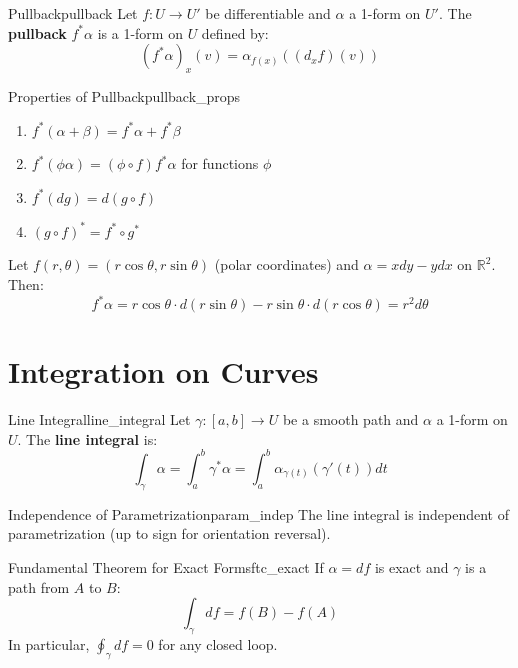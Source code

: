 \documentclass[11pt, letterpaper, openany]{book}
\begin{document}
\begin{defn}{Pullback}{pullback}
Let $f: U \to U'$ be differentiable and $\alpha$ a 1-form on $U'$. The \textbf{pullback} $f^*\alpha$ is a 1-form on $U$ defined by:
\[
(f^*\alpha)_x(v) = \alpha_{f(x)}((d_x f)(v))
\]
\end{defn}

\begin{thm}{Properties of Pullback}{pullback_props}
\begin{enumerate}
    \item $f^*(\alpha + \beta) = f^*\alpha + f^*\beta$
    \item $f^*(\phi \alpha) = (\phi \circ f) f^*\alpha$ for functions $\phi$
    \item $f^*(dg) = d(g \circ f)$
    \item $(g \circ f)^* = f^* \circ g^*$
\end{enumerate}
\end{thm}

\begin{example}
Let $f(r, \theta) = (r\cos\theta, r\sin\theta)$ (polar coordinates) and $\alpha = x dy - y dx$ on $\mathbb{R}^2$. Then:
\[
f^*\alpha = r\cos\theta \cdot d(r\sin\theta) - r\sin\theta \cdot d(r\cos\theta) = r^2 d\theta
\]
\end{example}

\section{Integration on Curves}

\begin{defn}{Line Integral}{line_integral}
Let $\gamma: [a,b] \to U$ be a smooth path and $\alpha$ a 1-form on $U$. The \textbf{line integral} is:
\[
\int_\gamma \alpha = \int_a^b \gamma^*\alpha = \int_a^b \alpha_{\gamma(t)}(\gamma'(t)) dt
\]
\end{defn}

\begin{thm}{Independence of Parametrization}{param_indep}
The line integral is independent of parametrization (up to sign for orientation reversal).
\end{thm}

\begin{thm}{Fundamental Theorem for Exact Forms}{ftc_exact}
If $\alpha = df$ is exact and $\gamma$ is a path from $A$ to $B$:
\[
\int_\gamma df = f(B) - f(A)
\]
In particular, $\oint_\gamma df = 0$ for any closed loop.
\end{thm}
\end{document}

